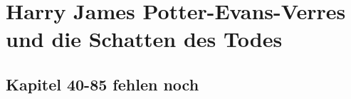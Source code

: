 \part{Harry James Potter-Evans-Verres und die Schatten des Todes}

% 
% 
% 
% 
% 
% 
% 
% 
% 
% 
% 
% 
% 
% 
% 
% 
% 
% 
% 
% 
% 
% 
% 
% 
% 
% 
% 
% 
% 
% 
% 
% 
% 
% 
% 
% 
% 
% 
% 
% 
% 
% 
% 
% 
% 
\chapter*{Kapitel 40-85 fehlen noch}
